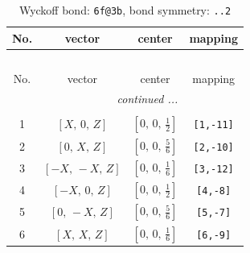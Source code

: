 \documentclass[fleqn,8pt]{jsarticle}
\begin{document}
\begin{longtable}{cccc}
\caption{Wyckoff bond: {\tt 6f@3b}, bond symmetry: {\tt ..2}}
 \\
 \hline \hline
No. & vector & center & mapping \\ \hline \endfirsthead

\multicolumn{3}{l}{\tablename\ \thetable{}} \\
 \hline \hline
No. & vector & center & mapping \\ \hline \endhead

 \hline \hline
\multicolumn{3}{r}{\footnotesize\it continued ...} \\ \endfoot

 \hline \hline
\multicolumn{3}{r}{} \\ \endlastfoot

1 & $\left[ X,\, 0,\, Z \right]$ & $\left[ 0,\, 0,\, \frac{1}{2} \right]$ & {\tt [1,-11]} \\ \hline
2 & $\left[ 0,\, X,\, Z \right]$ & $\left[ 0,\, 0,\, \frac{5}{6} \right]$ & {\tt [2,-10]} \\ \hline
3 & $\left[ - X,\, - X,\, Z \right]$ & $\left[ 0,\, 0,\, \frac{1}{6} \right]$ & {\tt [3,-12]} \\ \hline
4 & $\left[ - X,\, 0,\, Z \right]$ & $\left[ 0,\, 0,\, \frac{1}{2} \right]$ & {\tt [4,-8]} \\ \hline
5 & $\left[ 0,\, - X,\, Z \right]$ & $\left[ 0,\, 0,\, \frac{5}{6} \right]$ & {\tt [5,-7]} \\ \hline
6 & $\left[ X,\, X,\, Z \right]$ & $\left[ 0,\, 0,\, \frac{1}{6} \right]$ & {\tt [6,-9]} \\
\end{longtable}
\renewcommand{\arraystretch}{1.2}
\end{document}

